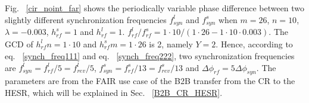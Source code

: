 Fig. ~\ref{cir_noint_far} shows the periodically variable phase difference between two slightly different synchronization frequencies $f_{\mathit{syn}}^{l}$ and $f_{\mathit{syn}}^{s}$ when $m=26$, $n=10$, $\lambda=-0.003$, $h^s_\mathit{rf}=1$ and $h^l_\mathit{rf}=1$. $f_{\mathit{rf}}^{l}/f_{\mathit{rf}}^{s}=1\cdot 10/(1\cdot26-1\cdot10\cdot0.003)$. The GCD of $h^l_\mathit{rf}n=1\cdot10$ and $h^s_\mathit{rf} m=1\cdot26$ is 2, namely $Y=2$. Hence, according to eq. ~\ref{synch_freq111} and eq. ~\ref{synch_freq222}, two synchronization frequencies are $f_{\mathit{syn}}^{l}=f_{\mathit{rf}}^{l}/5=f_{\mathit{rev}}^{l}/5$, $f_{\mathit{syn}}^{s}=f_{\mathit{rf}}^{s}/13=f_{\mathit{rev}}^{s}/13$ and $\Delta \phi_\mathit{rf}=5\Delta \phi_\mathit{syn}$. The parameters are from the FAIR use case of the B2B transfer from the CR to the HESR, which will be explained in Sec. ~\ref{B2B_CR_HESR}. 



